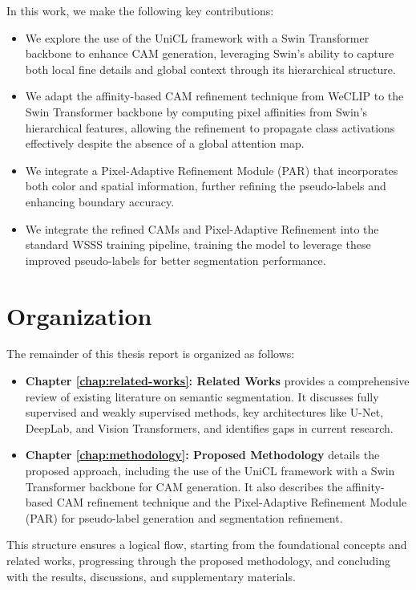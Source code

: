In this work, we make the following key contributions:

\begin{itemize}
    \item We explore the use of the UniCL framework \cite{vl_unicl} with a Swin Transformer backbone \cite{transformer_swin} to enhance CAM generation, leveraging Swin's ability to capture both local fine details and global context through its hierarchical structure.
    \item We adapt the affinity-based CAM refinement technique from WeCLIP \cite{wsss_frozen_clip} to the Swin Transformer backbone by computing pixel affinities from Swin's hierarchical features, allowing the refinement to propagate class activations effectively despite the absence of a global attention map.
    \item We integrate a Pixel-Adaptive Refinement Module (PAR) \cite{wsss_afa_affinity_from_attention} that incorporates both color and spatial information, further refining the pseudo-labels and enhancing boundary accuracy.
    \item We integrate the refined CAMs and Pixel-Adaptive Refinement into the standard WSSS training pipeline, training the model to leverage these improved pseudo-labels for better segmentation performance.

\end{itemize}

\section{Organization}
\label{sec:organization}

The remainder of this thesis report is organized as follows:

\begin{itemize}
    \item \textbf{Chapter \ref{chap:related-works}: Related Works} provides a comprehensive review of existing literature on semantic segmentation. It discusses fully supervised and weakly supervised methods, key architectures like U-Net, DeepLab, and Vision Transformers, and identifies gaps in current research.

    \item \textbf{Chapter \ref{chap:methodology}: Proposed Methodology} details the proposed approach, including the use of the UniCL framework with a Swin Transformer backbone for CAM generation. It also describes the affinity-based CAM refinement technique and the Pixel-Adaptive Refinement Module (PAR) for pseudo-label generation and segmentation refinement.
\end{itemize}

This structure ensures a logical flow, starting from the foundational concepts and related works, progressing through the proposed methodology, and concluding with the results, discussions, and supplementary materials.

